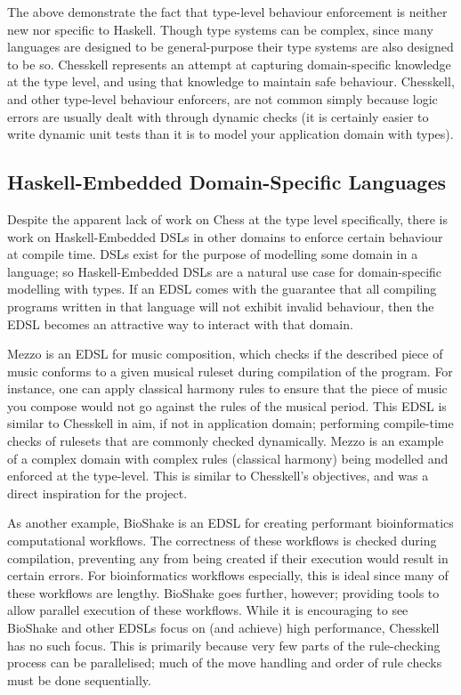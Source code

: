 The above demonstrate the fact that type-level behaviour enforcement is neither new nor specific to Haskell. Though type systems can be complex, since many languages are designed to be general-purpose their type systems are also designed to be so. Chesskell represents an attempt at capturing domain-specific knowledge at the type level, and using that knowledge to maintain safe behaviour. Chesskell, and other type-level behaviour enforcers, are not common simply because logic errors are usually dealt with through dynamic checks (it is certainly easier to write dynamic unit tests than it is to model your application domain with types).

\subsection{Haskell-Embedded Domain-Specific Languages}

Despite the apparent lack of work on Chess at the type level specifically, there is work on Haskell-Embedded DSLs in other domains to enforce certain behaviour at compile time. DSLs exist for the purpose of modelling some domain in a language; so Haskell-Embedded DSLs are a natural use case for domain-specific modelling with types. If an EDSL comes with the guarantee that all compiling programs written in that language will not exhibit invalid behaviour, then the EDSL becomes an attractive way to interact with that domain.

Mezzo \cite{mezzohaskellsymposium} is an EDSL for music composition, which checks if the described piece of music conforms to a given musical ruleset during compilation of the program. For instance, one can apply classical harmony rules to ensure that the piece of music you compose would not go against the rules of the musical period. This EDSL is similar to Chesskell in aim, if not in application domain; performing compile-time checks of rulesets that are commonly checked dynamically. Mezzo is an example of a complex domain with complex rules (classical harmony) being modelled and enforced at the type-level. This is similar to Chesskell's objectives, and was a direct inspiration for the project.

As another example, BioShake \cite{bioshake} is an EDSL for creating performant bioinformatics computational workflows. The correctness of these workflows is checked during compilation, preventing any from being created if their execution would result in certain errors. For bioinformatics workflows especially, this is ideal since many of these workflows are lengthy. BioShake goes further, however; providing tools to allow parallel execution of these workflows. While it is encouraging to see BioShake and other EDSLs \cite{aplite} focus on (and achieve) high performance, Chesskell has no such focus. This is primarily because very few parts of the rule-checking process can be parallelised; much of the move handling and order of rule checks must be done sequentially.

